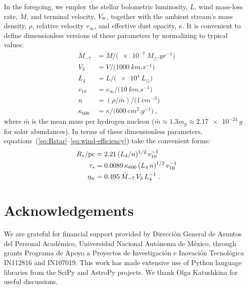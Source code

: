 \documentclass[useAMS, usenatbib, a4paper]{mnras}
\begin{document}
In the foregoing, we employ the stellar bolometric luminosity, \(L\),
wind mass-loss rate, \(\dot{M}\), and terminal velocity, \(V_{\text{w}}\),
together with the ambient stream's mass density, \(\rho\), relative
velocity \(v_\infty\), and effective dust opacity, \(\kappa\).  It is convenient
to define dimensionless versions of these parameters by normalizing to
typical values:
\begin{align*}
  \dot{M}_{-7} &= \dot{M} / \bigl(\SI{e-7}{M_\odot.yr^{-1}}\bigr) \\
  V_3 &= V / \bigl(\SI{1000}{km.s^{-1}}\bigr) \\
  L_4 &= L / \bigl(\SI{e4}{L_\odot}\bigr) \\
  v_{10} &= v_\infty / \bigl( \SI{10}{km.s^{-1}} \bigr) \\
  n &= (\rho / \bar{m}) / \bigl( \SI{1}{cm^{-3}} \bigr) \\
  \kappa_{600} &= \kappa / \bigl( \SI{600}{cm^2.g^{-1}} \bigr) \ ,
\end{align*}
where \(\bar{m}\) is the mean mass per hydrogen nucleon
(\(\bar{m} \approx 1.3 m_{\text{p}} \approx \SI{2.17e-24}{g}\) for solar
abundances).  In terms of these dimensionless parameters,
equations~(\ref{eq:Rstar}--\ref{eq:wind-efficiency}) take the
convenient forms:
\begin{align}
  \label{eq:Rstar-typical}
  R_* / \si{pc} &= \num{2.21} \, (L_4 / n)^{1/2} \,v_{10}^{-1} \\
  \label{eq:taustar-typical}
  \tau_* &= \num{0.0089} \,\kappa_{600} \, (L_4 \,n)^{1/2} \,v_{10}^{-1} \\
  \label{eq:wind-eta-typical}
  \eta\wind &= \num{0.495} \,\dot{M}_{-7} \,V_3  \,L_4^{-1} \ .
\end{align}








\section*{Acknowledgements}
We are grateful for financial support provided by Dirección General de
Asuntos del Personal Académico, Universidad Nacional Autónoma de
México, through grants Programa de Apoyo a Proyectos de Investigación
e Inovación Tecnológica IN112816 and IN107019.  This work has made
extensive use of Python language libraries from the SciPy
\citep{Jones:2001a} and AstroPy \citep{Astropy-Collaboration:2013a,
  Astropy-Collaboration:2018a} projects.  We thank Olga Katushkina for useful discussions. 




\appendix


\bsp	%
\label{lastpage}
\end{document}
